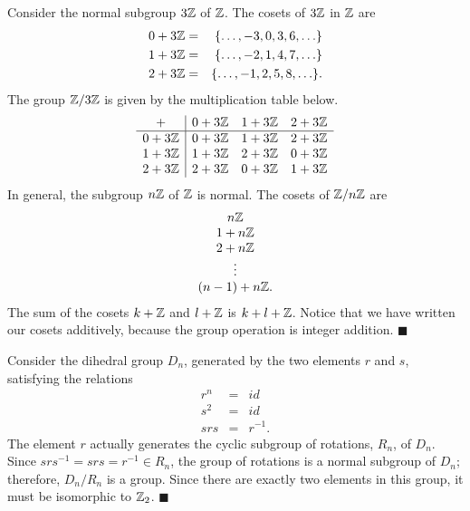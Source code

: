  
Consider the normal subgroup $3 {\Bbb Z}$ of ${\Bbb Z}$. The cosets of
$3 {\Bbb Z}$ in ${\Bbb Z}$ are 
\begin{eqnarray*}
0 + 3 {\Bbb Z} & = & \{ \ldots, -3, 0, 3, 6, \ldots \} \\
1 + 3 {\Bbb Z} & = & \{ \ldots, -2, 1, 4, 7, \ldots \} \\
2 + 3 {\Bbb Z} & = & \{ \ldots, -1, 2, 5, 8, \ldots \}.
\end{eqnarray*}
The group   ${\Bbb Z}/ 3 {\Bbb Z}$ is given by the multiplication
table below. 
$$
\begin{array}{c|ccc}
+             & 0 + 3{\Bbb Z}     & 1 + 3{\Bbb Z} & 2 + 3{\Bbb Z} \\
\hline
0 + 3{\Bbb Z} & 0 + 3 {\Bbb Z} & 1 + 3{\Bbb Z} & 2 + 3{\Bbb Z}
\\
1 + 3{\Bbb Z} & 1 +3{\Bbb Z} & 2 + 3{\Bbb Z} &  0 +  3{\Bbb Z}
\\
2 + 3{\Bbb Z} & 2 +3{\Bbb Z} &  0 +   3{\Bbb Z} & 1 + 3{\Bbb Z}
\end{array}
$$
In general, the subgroup $n {\Bbb Z}$ of ${\Bbb Z}$ is normal. The
cosets of ${\Bbb Z } / n {\Bbb Z}$ are 
$$
\begin{array}{c}
n {\Bbb Z} \\
1 + n {\Bbb Z} \\
2 + n {\Bbb Z} \\
\vdots \\
(n-1) + n {\Bbb Z}.
\end{array}
$$
The sum of the cosets $k + {\Bbb Z}$ and $l + {\Bbb Z}$ is $k+l + 
{\Bbb Z}$. Notice that  we have written our cosets additively, 
because the group operation is integer addition. 
\mbox{\hspace*{1in}}
\hspace{\fill} $\blacksquare$
 
 
\medskip
 
 
Consider the dihedral group $D_n$, generated by the two elements $r$
and $s$, satisfying the relations 
\begin{eqnarray*}
r^n & = & id \\
s^2 & = & id \\
srs & = & r^{-1}.
\end{eqnarray*}
The element $r$ actually generates the cyclic subgroup of rotations,
$R_n$, of $D_n$.  Since $srs^{-1} = srs = r^{-1} \in R_n$, the group
of rotations is a normal subgroup of $D_n$; therefore, $D_n / R_n$ is
a group.  Since there are exactly two elements in this group, it must
be isomorphic to ${\Bbb Z}_2$.
\hspace{\fill} $\blacksquare$
 
